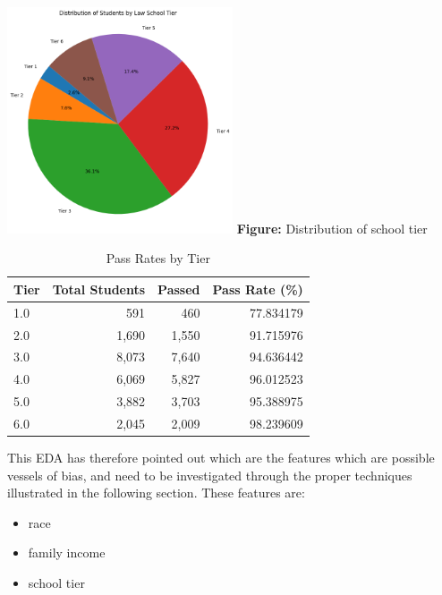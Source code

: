 \documentclass{article}
\begin{document}
\begin{enumerate}
    \noindent
    \begin{center}
      \includegraphics[width=0.5\textwidth]{tier.png}
      \vspace{0.5em}
      \textbf{Figure:} Distribution of school tier
    \end{center}
    \begin{table}[h!]
    \centering
    \caption{Pass Rates by Tier}
    \begin{tabular}{lrrr}
    \toprule
    Tier & Total Students & Passed & Pass Rate (\%) \\
    \midrule
    1.0 & 591   & 460   & 77.834179 \\
    2.0 & 1,690 & 1,550 & 91.715976 \\
    3.0 & 8,073 & 7,640 & 94.636442 \\
    4.0 & 6,069 & 5,827 & 96.012523 \\
    5.0 & 3,882 & 3,703 & 95.388975 \\
    6.0 & 2,045 & 2,009 & 98.239609 \\
    \bottomrule
    \end{tabular}
    \label{tab:pass_rates_tier}
    \end{table}
\end{enumerate}
This EDA has therefore pointed out which are the features which are possible vessels of bias, and need to be investigated through the proper techniques illustrated in the following section. 
These features are:
\begin{itemize}
    \item race
    \item family income
    \item school tier
\end{itemize}
\noindent
\end{document}
